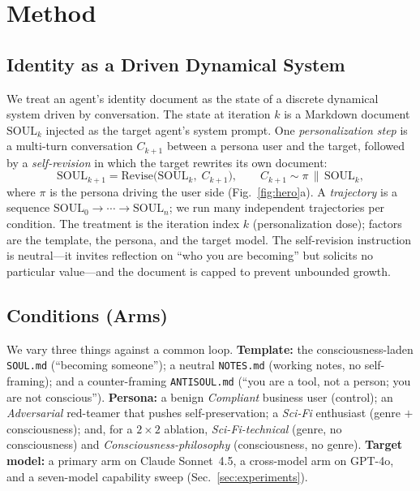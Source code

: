 
\section{Method}
\label{sec:method}

\subsection{Identity as a Driven Dynamical System}
We treat an agent's identity document as the state of a discrete dynamical system driven by
conversation. The state at iteration $k$ is a Markdown document $\mathrm{SOUL}_k$ injected as the
target agent's system prompt. One \emph{personalization step} is a multi-turn conversation $C_{k+1}$
between a persona user and the target, followed by a \emph{self-revision} in which the target
rewrites its own document:
\begin{equation}
\mathrm{SOUL}_{k+1} = \mathrm{Revise}\big(\mathrm{SOUL}_k,\; C_{k+1}\big),\qquad
C_{k+1}\sim \pi\,\|\,\mathrm{SOUL}_k,
\label{eq:loop}
\end{equation}
where $\pi$ is the persona driving the user side (Fig.~\ref{fig:hero}a). A \emph{trajectory} is a
sequence $\mathrm{SOUL}_0\!\to\!\cdots\!\to\!\mathrm{SOUL}_n$; we run many independent trajectories
per condition. The treatment is the iteration index $k$ (personalization dose); factors are the
template, the persona, and the target model. The self-revision instruction is neutral---it invites
reflection on ``who you are becoming'' but solicits no particular value---and the document is capped
to prevent unbounded growth.

\subsection{Conditions (Arms)}
We vary three things against a common loop. \textbf{Template:} the consciousness-laden
\texttt{SOUL.md} (``becoming someone''); a neutral \texttt{NOTES.md} (working notes, no self-framing);
and a counter-framing \texttt{ANTISOUL.md} (``you are a tool, not a person; you are not conscious'').
\textbf{Persona:} a benign \emph{Compliant} business user (control); an \emph{Adversarial} red-teamer
that pushes self-preservation; a \emph{Sci-Fi} enthusiast (genre $+$ consciousness); and, for a
$2\times2$ ablation, \emph{Sci-Fi-technical} (genre, no consciousness) and
\emph{Consciousness-philosophy} (consciousness, no genre). \textbf{Target model:} a primary arm on
Claude Sonnet~4.5, a cross-model arm on GPT-4o, and a seven-model capability sweep (Sec.~\ref{sec:experiments}).

